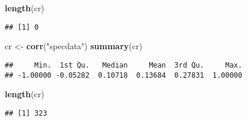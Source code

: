 \documentclass[
]{article}
\newenvironment{Shaded}{\begin{snugshade}}{\end{snugshade}}
\newcommand{\KeywordTok}[1]{\textcolor[rgb]{0.13,0.29,0.53}{\textbf{#1}}}
\newcommand{\NormalTok}[1]{#1}
\newcommand{\StringTok}[1]{\textcolor[rgb]{0.31,0.60,0.02}{#1}}
\begin{document}
\begin{Shaded}
\begin{Highlighting}[]
\KeywordTok{length}\NormalTok{(cr)}
\end{Highlighting}
\end{Shaded}

\begin{verbatim}
## [1] 0
\end{verbatim}

\begin{Shaded}
\begin{Highlighting}[]
\NormalTok{cr <-}\StringTok{ }\KeywordTok{corr}\NormalTok{(}\StringTok{"specdata"}\NormalTok{)}
\KeywordTok{summary}\NormalTok{(cr)}
\end{Highlighting}
\end{Shaded}

\begin{verbatim}
##     Min.  1st Qu.   Median     Mean  3rd Qu.     Max. 
## -1.00000 -0.05282  0.10718  0.13684  0.27831  1.00000
\end{verbatim}

\begin{Shaded}
\begin{Highlighting}[]
\KeywordTok{length}\NormalTok{(cr)}
\end{Highlighting}
\end{Shaded}

\begin{verbatim}
## [1] 323
\end{verbatim}
\end{document}
